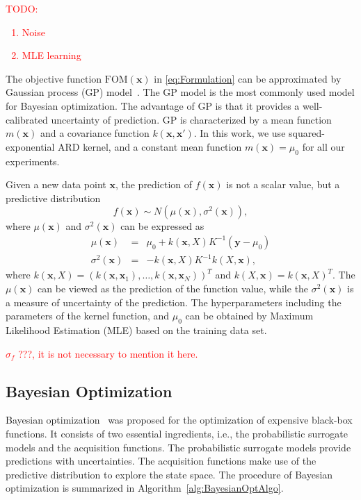 \textcolor{red}{
    TODO:
    \begin{enumerate}
            \item Noise
            \item MLE learning
    \end{enumerate}
}

The objective function $\mathrm{FOM}(\bm{x})$ in \eqref{eq:Formulation} can be approximated by Gaussian
process (GP) model~\cite{GPML}. The GP model is the most commonly used model
for Bayesian optimization. The advantage of GP is that it provides a
well-calibrated uncertainty of prediction. GP is characterized by a mean
function $m(\bm{x})$ and a covariance function $k(\bm{x}, \bm{x'})$. In this
work, we use squared-exponential ARD kernel, and a constant mean function
$m(\bm{x}) = \mu_0$ for all our experiments.

Given a new data point $\bm{x}$, the prediction of $f(\bm{x})$ is
not a scalar value, but a predictive distribution
\begin{equation}
f(\bm{x}) \sim N(\mu(\bm{x}),
\sigma^2(\bm{x})),
\label{eq:GPRPred}
\end{equation}
where $\mu(\bm{x})$ and $\sigma^2(\bm{x})$ can be expressed as
\begin{equation}
        \begin{array}{lll}
            \mu(\bm{x}) &=& \mu_0 + k(\bm{x},X)K^{-1}(\bm{y} - \mu_0) \\
            \sigma^2(\bm{x}) &=&  - k(\bm{x}, X)K^{-1}k(X, \bm{x}),
        \end{array}
    \label{eq:GPRPredEqNoisy}
\end{equation}
where $k(\bm{x}, X) = (k(\bm{x}, \bm{x}_1), \dots, k(\bm{x},
\bm{x}_N))^T$ and $k(X, \bm{x}) = k(\bm{x}, X)^T$. The
$\mu(\bm{x})$ can be viewed as the prediction of the function value, while
the $\sigma^2(\bm{x})$ is a measure of uncertainty of the prediction. The hyperparameters including the parameters of the kernel function, and $\mu_0$ can be obtained by Maximum Likelihood Estimation (MLE) based on the training data set. 

\textcolor{red}{$\sigma_f$ ???, it is not necessary to mention it here.}

\subsection{Bayesian Optimization}

Bayesian optimization~\cite{shahriari2016taking} was proposed for the
optimization of expensive black-box functions. It consists of two essential
ingredients, i.e., the probabilistic surrogate models and the acquisition
functions. The probabilistic surrogate models provide predictions with
uncertainties. The acquisition functions make use of the predictive
distribution to explore the state space. The procedure of Bayesian optimization
is summarized in Algorithm~\ref{alg:BayesianOptAlgo}.



